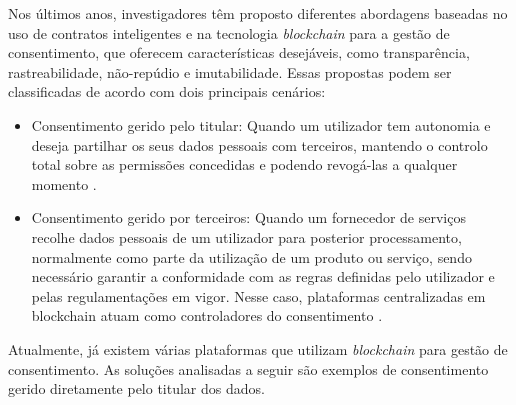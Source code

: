 Nos últimos anos, investigadores têm proposto diferentes abordagens baseadas no uso de contratos inteligentes e na tecnologia \textit{blockchain} para a gestão de consentimento, que oferecem características desejáveis, como transparência, rastreabilidade, não-repúdio e imutabilidade. Essas propostas podem ser classificadas de acordo com dois principais cenários:

\begin{itemize}
    \item Consentimento gerido pelo titular: Quando um utilizador tem autonomia e deseja partilhar os seus dados pessoais com terceiros, mantendo o controlo total sobre as permissões concedidas e podendo revogá-las a qualquer momento \citep{Merlec2021}.
    \item Consentimento gerido por terceiros: Quando um fornecedor de serviços recolhe dados pessoais de um utilizador para posterior processamento, normalmente como parte da utilização de um produto ou serviço, sendo necessário garantir a conformidade com as regras definidas pelo utilizador e pelas regulamentações em vigor. Nesse caso, plataformas centralizadas em blockchain atuam como controladores do consentimento \citep{Aldred2019}.
\end{itemize}

Atualmente, já existem várias plataformas que utilizam \textit{blockchain} para gestão de consentimento. 
As soluções analisadas a seguir são exemplos de consentimento gerido diretamente pelo titular dos dados.

